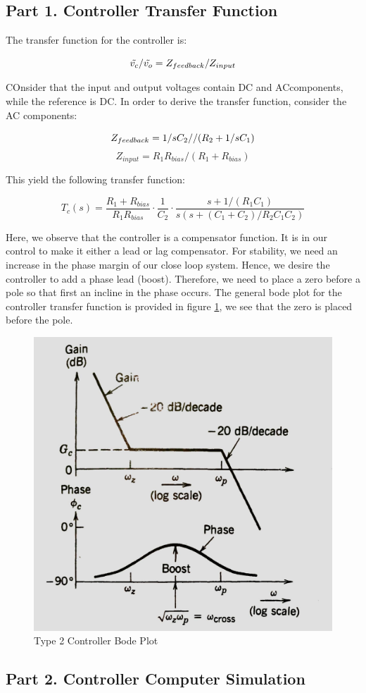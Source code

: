 \documentclass[12pt]{article}
\begin{document}
\subsection{Part 1. Controller Transfer Function}

The transfer function for the controller is:

\begin{equation*}
    \Tilde{v_{c}}/\Tilde{v_{o}}=Z_{feedback}/Z_{input}
\end{equation*}

COnsider that the input and output voltages contain DC and ACcomponents, while the reference is DC. In order to derive the transfer function, consider the AC components:


\begin{equation*}
    Z_{feedback}=1/sC_2// (R_2 +1/sC_1)\\
\end{equation*}
\begin{equation*}
Z_{input}=R_1 R_{bias}/(R_1 + R_{bias})
\end{equation*}

This yield the following transfer function:

\begin{equation*}
T_c(s)=\dfrac{R_1+R_{bias}}{R_1 R_{bias} }\cdot \dfrac{1}{C_2}\cdot \dfrac{s+1/(R_1 C_1)}{s(s+(C_1+C_2)/R_2C_1C_2)}
\end{equation*}

Here, we observe that the controller is a compensator function. It is in our control to make it either a lead or lag compensator. For stability, we need an increase in the phase margin of our close loop system. Hence, we desire the controller to add a phase lead (boost). Therefore, we need to place a zero before a pole so that first an incline in the phase occurs. The general bode plot for the controller transfer function is provided in figure \ref{fig:bode}, we see that the zero is placed before the pole. 

\begin{figure}[H]
    \centering
    \includegraphics[width=10 cm]{bode}
    \caption{Type 2 Controller Bode Plot}
    \label{fig:bode}
\end{figure}

\subsection{Part 2. Controller Computer Simulation}
\end{document}
